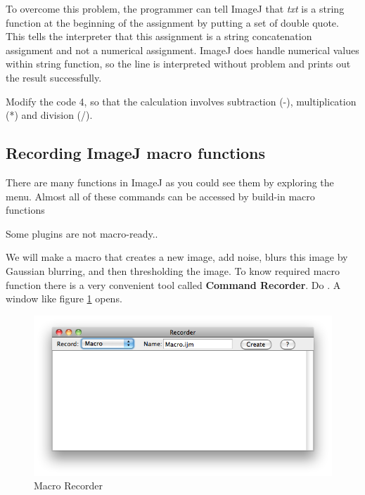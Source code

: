 To overcome this problem, the programmer can tell ImageJ that 
\textit{txt} is a string function at the beginning of the assignment 
by putting a set of double quote. This tells the interpreter that this assignment is a string concatenation assignment and not a numerical assignment. 
ImageJ does handle numerical values within string function, 
so the line is interpreted without problem and prints out the result successfully.  

\begin{indentexercise}{2}
Modify the code 4, so that the calculation involves subtraction (-), multiplication (*) and division (/). 
\end{indentexercise}

\subsection{Recording ImageJ macro functions}
There are many functions in ImageJ as you could see them by exploring the menu. Almost all of these commands can be accessed by build-in macro functions\

{Some plugins are not macro-ready.}.

We will make a macro that creates a new image, add noise, blurs this image by Gaussian blurring, and then thresholding the image. To know required macro function there is a very convenient tool called \textbf{Command Recorder}. 
Do . A window like figure
\ref{fig_macroRecorderBlank} opens.

\begin{figure}[htbp]
\begin{center}
\includegraphics[scale=0.6]{fig/MacroRecorderBlank.png}
\caption{Macro Recorder} \label{fig_macroRecorderBlank}
\end{center}
\end{figure}

